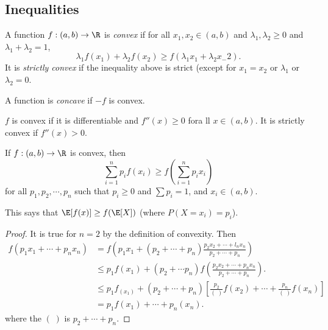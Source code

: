 \documentclass[a4paper]{article}
\begin{document}
\subsection{Inequalities}
\begin{defi}
  A function $f: (a, b) \to \R$ is \emph{convex} if for all $x_1, x_2\in (a, b)$ and $\lambda_1, \lambda_2 \geq 0$ and $\lambda_1 + \lambda_2 = 1$,\[
    \lambda_1f(x_1) + \lambda_2 f(x_2) \geq f(\lambda_1x_1 + \lambda_2 x_-2).
  \]
  It is \emph{strictly convex} if the inequality above is strict (except for $x_1 = x_2$ or $\lambda_1$ or $\lambda_2 = 0$.

  \begin{center}
  \end{center}
  A function is \emph{concave} if $-f$ is convex.
\end{defi}

\begin{prop}
  $f$ is convex if it is differentiable and $f''(x) \geq 0$ fora ll $x\in (a, b)$. It is strictly convex if $f''(x) > 0$.
\end{prop}

\begin{thm}
  If $f:(a, b) \to \R$ is convex, then
  \[
    \sum_{i = 1}^n p_i f(x_i) \geq f\left(\sum_{i = 1}^n p_ix_i\right)
  \]
  for all $p_1, p_2, \cdots, p_n$ such that $p_i \geq 0$ and $\sum p_i = 1$, and $x_i \in (a, b)$.

  This says that $\E[f(x)] \geq f(\E[X])$ (where $P(X=x_i) = p_i$).
\end{thm}

\begin{proof}
  It is true for $n = 2$ by the definition of convexity. Then
  \begin{align*}
    f(p_1x_1 + \cdots + p_nx_n) &= f\left(p_1x_1 + (p_2 + \cdots + p_n)\frac{p_2x_2 + \cdots + l_nx_n}{p_2 + \cdots + p_n}\right)\\
    &\leq p_1f(x_1) + (p_2 + \cdots p_n)f\left(\frac{p_2x_2 + \cdots + p_n x_n}{p_2 + \cdots + p_n }\right).\\
    &\leq p_1f_(x_1) + (p_2 + \cdots + p_n)\left[\frac{p_2}{(\;)}f(x_2) + \cdots + \frac{p_n}{(\;)}f(x_n)\right]\\
    &= p_1f(x_1) + \cdots + p_n(x_n).
  \end{align*}
  where the $(\;)$ is $p_2 + \cdots + p_n$.
\end{proof}
\end{document}
